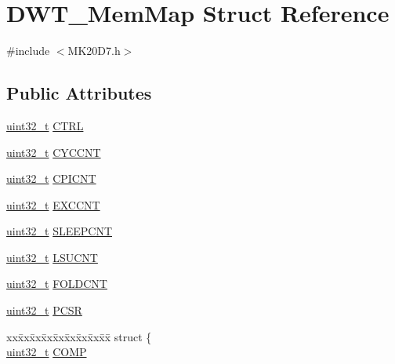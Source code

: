 \hypertarget{struct_d_w_t___mem_map}{}\section{D\+W\+T\+\_\+\+Mem\+Map Struct Reference}
\label{struct_d_w_t___mem_map}


{\ttfamily \#include $<$M\+K20\+D7.\+h$>$}

\subsection*{Public Attributes}
\begin{DoxyCompactItemize}
\item 
\hyperlink{_p_e___types_8h_a33594304e786b158f3fb30289278f5af}{uint32\+\_\+t} \hyperlink{struct_d_w_t___mem_map_ab3581abb33e428126e7ec339e66514e4}{C\+T\+RL}
\item 
\hyperlink{_p_e___types_8h_a33594304e786b158f3fb30289278f5af}{uint32\+\_\+t} \hyperlink{struct_d_w_t___mem_map_adf38ec6a1c7381ff5e894b4f2fc2af1e}{C\+Y\+C\+C\+NT}
\item 
\hyperlink{_p_e___types_8h_a33594304e786b158f3fb30289278f5af}{uint32\+\_\+t} \hyperlink{struct_d_w_t___mem_map_ad09ed41fc08aebfa2c29e217afcf9a93}{C\+P\+I\+C\+NT}
\item 
\hyperlink{_p_e___types_8h_a33594304e786b158f3fb30289278f5af}{uint32\+\_\+t} \hyperlink{struct_d_w_t___mem_map_ae76c95a5c70db8790d92dbf9e404e3aa}{E\+X\+C\+C\+NT}
\item 
\hyperlink{_p_e___types_8h_a33594304e786b158f3fb30289278f5af}{uint32\+\_\+t} \hyperlink{struct_d_w_t___mem_map_a0c31354b6fe3f3dd79bc5b768bea4f46}{S\+L\+E\+E\+P\+C\+NT}
\item 
\hyperlink{_p_e___types_8h_a33594304e786b158f3fb30289278f5af}{uint32\+\_\+t} \hyperlink{struct_d_w_t___mem_map_a748bc2765a5d7f9813e099dcfdf55980}{L\+S\+U\+C\+NT}
\item 
\hyperlink{_p_e___types_8h_a33594304e786b158f3fb30289278f5af}{uint32\+\_\+t} \hyperlink{struct_d_w_t___mem_map_a74e31352303671690d8a8e173fae836e}{F\+O\+L\+D\+C\+NT}
\item 
\hyperlink{_p_e___types_8h_a33594304e786b158f3fb30289278f5af}{uint32\+\_\+t} \hyperlink{struct_d_w_t___mem_map_a58d461cd26674ff3bce87778c4b54164}{P\+C\+SR}
\item 
\begin{tabbing}
xx\=xx\=xx\=xx\=xx\=xx\=xx\=xx\=xx\=\kill
struct \{\\
\>\hyperlink{_p_e___types_8h_a33594304e786b158f3fb30289278f5af}{uint32\_t} \hyperlink{struct_d_w_t___mem_map_ae10b19c1d610d27a71a1dc34a84a0e60}{COMP}\\

\end{tabbing}
\end{DoxyCompactItemize}
